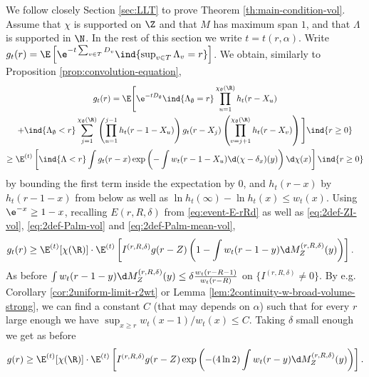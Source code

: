 \documentclass[10pt,a4paper]{article}
\begin{document}
We follow closely Section \ref{sec:LLT} to prove Theorem \ref{th:main-condition-vol}.  Assume that $\chi$ is supported on $\Z$ and that $M$ has maximum span $1$, and that $\Lambda$ is supported in $\N$. 
In the rest of this section we write $t = t(r,\alpha)$.
%
Write $g_t(r) = \E\left[ \e^{-t\sum_{v\in T} D_v} \ind{\sup_{v\in T} \Lambda_v = r} \right]$. We obtain, similarly to Proposition \ref{prop:convolution-equation},
\begin{multline}\label{eq:2convolution-LLT-vol}
g_t(r) = \E\Bigg[\e^{-tD_\emptyset} \ind{\Lambda_\emptyset = r} \prod_{u=1}^{\chi_\emptyset(\R)} h_t(r-X_u) \\
+ \ind{\Lambda_\emptyset < r} \sum_{j=1}^{\chi_\emptyset(\R)} \left(\prod_{u=1}^{j-1} h_t(r-1-X_u)\right) g_t(r-X_j) \left(\prod_{v=j+1}^{\chi_\emptyset(\R)} h_t(r-X_v) \right) \Bigg] \ind{r\geq 0} \\
\geq \E^{(t)}\left[ \ind{\Lambda < r} \int g_t(r-x) \exp\left( - \int w_t(r-1-X_u) \d(\chi-\delta_{x})(y)\right) \d\chi(x) \right] \ind{r\geq 0}
\end{multline}
by bounding the first term inside the expectation by $0$, and $h_t(r-x)$ by $h_t(r-1-x)$ from below as well as $\ln h_t(\infty)-\ln h_t(x) \leq w_t(x)$. Using $\e^{-x}\geq 1-x$, recalling $E(r,R,\delta)$ from \eqref{eq:event-E-rRd} as well as \eqref{eq:2def-ZI-vol}, \eqref{eq:2def-Palm-vol} and \eqref{eq:2def-Palm-mean-vol}, 
\begin{align}
g_t(r) %
&\geq \E^{(t)}[\chi(\R)] \cdot \E^{(t)}\left[ I^{(r,R,\delta)} g(r-Z) \left( 1 - \int w_t(r-1-y) \d M_Z^{(r,R,\delta)}(y) \right) \right] .
\end{align}
As before $\int w_t(r-1-y) \d M_Z^{(r,R,\delta)}(y) \leq \delta \frac{w_t(r-R-1)}{w_t(r-R)}$ on $\{I^{(r,R,\delta)}\neq 0\}$. 
By e.g. Corollary \ref{cor:2uniform-limit-r2wt} or Lemma \ref{lem:2continuity-w-broad-volume-strong}, we can find a constant $C$ (that may depends on $\alpha$) such that 
for every $r$ large enough we have $\sup_{x\geq r} w_t(x-1)/w_t(x) \leq C$. Taking $\delta$ small enough we get as before
\[ g(r) \geq \E^{(t)}[\chi(\R)] \cdot \E^{(t)}\left[ I^{(r,R,\delta)} g(r-Z) \exp\left( - (4\ln 2) \int w_t(r-y) \d M_Z^{(r,R,\delta)}(y) \right) \right] . \]
\end{document}
